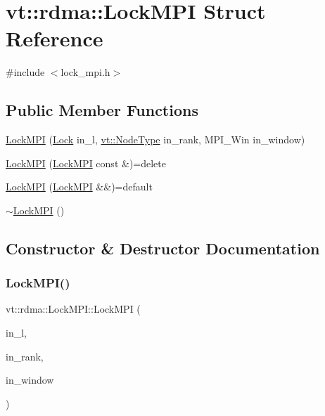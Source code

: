 \hypertarget{structvt_1_1rdma_1_1_lock_m_p_i}{}\section{vt\+:\+:rdma\+:\+:Lock\+M\+PI Struct Reference}
\label{structvt_1_1rdma_1_1_lock_m_p_i}


{\ttfamily \#include $<$lock\+\_\+mpi.\+h$>$}

\subsection*{Public Member Functions}
\begin{DoxyCompactItemize}
\item 
\hyperlink{structvt_1_1rdma_1_1_lock_m_p_i_ae2b5446ca32b39ea0d726869f113ca20}{Lock\+M\+PI} (\hyperlink{namespacevt_1_1rdma_ac5c20b41a653e520b6305d4d454ecb70}{Lock} in\+\_\+l, \hyperlink{namespacevt_a866da9d0efc19c0a1ce79e9e492f47e2}{vt\+::\+Node\+Type} in\+\_\+rank, M\+P\+I\+\_\+\+Win in\+\_\+window)
\item 
\hyperlink{structvt_1_1rdma_1_1_lock_m_p_i_a82e24ca254c74bc236c1d46811b84310}{Lock\+M\+PI} (\hyperlink{structvt_1_1rdma_1_1_lock_m_p_i}{Lock\+M\+PI} const \&)=delete
\item 
\hyperlink{structvt_1_1rdma_1_1_lock_m_p_i_a676c1958d9d6ac777801548ae805c570}{Lock\+M\+PI} (\hyperlink{structvt_1_1rdma_1_1_lock_m_p_i}{Lock\+M\+PI} \&\&)=default
\item 
\hyperlink{structvt_1_1rdma_1_1_lock_m_p_i_aa504ea8f843941e7d409fa7979afd50d}{$\sim$\+Lock\+M\+PI} ()
\end{DoxyCompactItemize}


\subsection{Constructor \& Destructor Documentation}
\mbox{\label{structvt_1_1rdma_1_1_lock_m_p_i_ae2b5446ca32b39ea0d726869f113ca20}} 
\subsubsection{\texorpdfstring{Lock\+M\+P\+I()}{LockMPI()}\hspace{0.1cm}{\footnotesize\ttfamily [1/3]}}
{\footnotesize\ttfamily vt\+::rdma\+::\+Lock\+M\+P\+I\+::\+Lock\+M\+PI (\begin{DoxyParamCaption}\item[{\hyperlink{namespacevt_1_1rdma_ac5c20b41a653e520b6305d4d454ecb70}{Lock}}]{in\+\_\+l,  }\item[{\hyperlink{namespacevt_a866da9d0efc19c0a1ce79e9e492f47e2}{vt\+::\+Node\+Type}}]{in\+\_\+rank,  }\item[{M\+P\+I\+\_\+\+Win}]{in\+\_\+window }\end{DoxyParamCaption})\hspace{0.3cm}{\ttfamily [inline]}}


